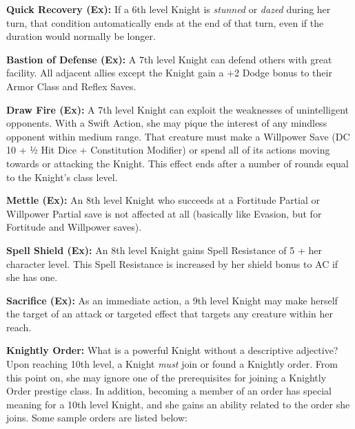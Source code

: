 \textbf{Quick Recovery (Ex):} If a 6th level Knight is \textit{stunned} or \textit{dazed} during her turn, that condition automatically ends at the end of that turn, even if the duration would normally be longer.

\textbf{Bastion of Defense (Ex):} A 7th level Knight can defend others with great facility. All adjacent allies except the Knight gain a +2 Dodge bonus to their Armor Class and Reflex Saves.

\textbf{Draw Fire (Ex):} A 7th level Knight can exploit the weaknesses of unintelligent opponents. With a Swift Action, she may pique the interest of any mindless opponent within medium range. That creature must make a Willpower Save (DC 10 + ½ Hit Dice + Constitution Modifier) or spend all of its actions moving towards or attacking the Knight. This effect ends after a number of rounds equal to the Knight's class level.

\textbf{Mettle (Ex):} An 8th level Knight who succeeds at a Fortitude Partial or Willpower Partial save is not affected at all (basically like Evasion, but for Fortitude and Willpower saves).

\textbf{Spell Shield (Ex):} An 8th level Knight gains Spell Resistance of 5 + her character level. This Spell Resistance is increased by her shield bonus to AC if she has one.

\textbf{Sacrifice (Ex):} As an immediate action, a 9th level Knight may make herself the target of an attack or targeted effect that targets any creature within her reach.

\textbf{Knightly Order:} What is a powerful Knight without a descriptive adjective? Upon reaching 10th level, a Knight \textit{must} join or found a Knightly order. From this point on, she may ignore one of the prerequisites for joining a Knightly Order prestige class. In addition, becoming a member of an order has special meaning for a 10th level Knight, and she gains an ability related to the order she joins. Some sample orders are listed below:

